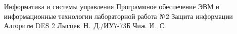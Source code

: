 \documentclass{bmstu}
\begin{document}
\makereporttitle
{Информатика и системы управления} %
{Программное обеспечение ЭВМ и информационные технологии}
{лабораторной работа №2} %
{Защита информации} %
{Алгоритм DES} %
{2} %
{Лысцев~Н.~Д./ИУ7-73Б} %
{Чиж~И.~С.} %
{}

\maketableofcontents



%
%
%
%

\makebibliography
\end{document}
